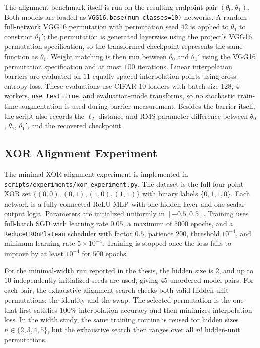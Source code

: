 \documentclass[11pt,a4paper]{report}
\begin{document}
The alignment benchmark itself is run on the resulting endpoint pair \((\theta_0,\theta_1)\). Both models are loaded as \texttt{VGG16.base(num\_classes=10)} networks. A random full-network VGG16 permutation with permutation seed \(42\) is applied to \(\theta_1\) to construct \(\theta_1'\); the permutation is generated layerwise using the project's VGG16 permutation specification, so the transformed checkpoint represents the same function as \(\theta_1\). Weight matching is then run between \(\theta_0\) and \(\theta_1'\) using the VGG16 permutation specification and at most \(100\) iterations. Linear interpolation barriers are evaluated on \(11\) equally spaced interpolation points using cross-entropy loss. These evaluations use CIFAR-10 loaders with batch size \(128\), \(4\) workers, \texttt{use\_test=true}, and evaluation-mode transforms, so no stochastic train-time augmentation is used during barrier measurement. Besides the barrier itself, the script also records the \(\ell_2\) distance and RMS parameter difference between \(\theta_0\), \(\theta_1\), \(\theta_1'\), and the recovered checkpoint.

\subsection{XOR Alignment Experiment}

The minimal XOR alignment experiment is implemented in \texttt{scripts/experiments/xor\_experiment.py}. The dataset is the full four-point XOR set \(\{(0,0),(0,1),(1,0),(1,1)\}\) with binary labels \(\{0,1,1,0\}\). Each network is a fully connected ReLU MLP with one hidden layer and one scalar output logit. Parameters are initialized uniformly in \([-0.5,0.5]\). Training uses full-batch SGD with learning rate \(0.05\), a maximum of \(5000\) epochs, and a \texttt{ReduceLROnPlateau} scheduler with factor \(0.5\), patience \(200\), threshold \(10^{-4}\), and minimum learning rate \(5\times 10^{-4}\). Training is stopped once the loss fails to improve by at least \(10^{-4}\) for \(500\) epochs.

For the minimal-width run reported in the thesis, the hidden size is \(2\), and up to \(10\) independently initialized seeds are used, giving \(45\) unordered model pairs. For each pair, the exhaustive alignment search checks both valid hidden-unit permutations: the identity and the swap. The selected permutation is the one that first satisfies \(100\%\) interpolation accuracy and then minimizes interpolation loss. In the width study, the same training routine is reused for hidden sizes \(n\in\{2,3,4,5\}\), but the exhaustive search then ranges over all \(n!\) hidden-unit permutations.
\end{document}

